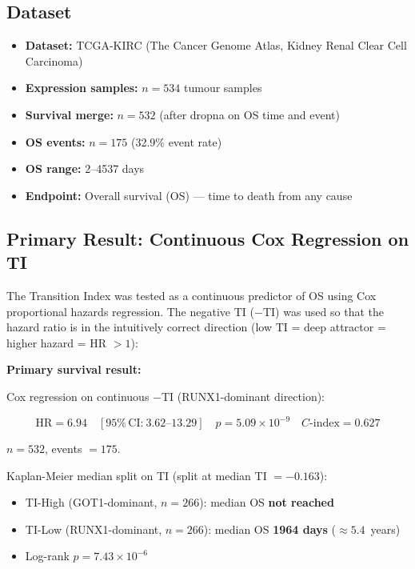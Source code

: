 \documentclass[11pt, a4paper]{article}
\begin{document}
\subsection{Dataset}

\begin{itemize}[noitemsep]
    \item \textbf{Dataset:} TCGA-KIRC
    (The Cancer Genome Atlas, Kidney Renal
    Clear Cell Carcinoma)
    \item \textbf{Expression samples:}
    $n = 534$ tumour samples
    \item \textbf{Survival merge:}
    $n = 532$ (after dropna on OS time
    and event)
    \item \textbf{OS events:} $n = 175$
    (32.9\% event rate)
    \item \textbf{OS range:} 2--4537 days
    \item \textbf{Endpoint:} Overall
    survival (OS) --- time to death from
    any cause
\end{itemize}

\subsection{Primary Result: Continuous Cox
Regression on TI}

The Transition Index was tested as a
continuous predictor of OS using Cox
proportional hazards regression.
The negative TI ($-$TI) was used so that
the hazard ratio is in the intuitively
correct direction (low TI = deep attractor
= higher hazard = HR $> 1$):

\begin{mdframed}[backgroundcolor=statsbox,
                 linecolor=purple!40!black,
                 linewidth=1pt]
\textbf{Primary survival result:}

\medskip
Cox regression on continuous $-$TI
(RUNX1-dominant direction):

\[
\text{HR} = 6.94 \quad
[95\%\,\text{CI:}\ 3.62\text{--}13.29]
\quad p = 5.09 \times 10^{-9}
\quad C\text{-index} = 0.627
\]

$n = 532$, events $= 175$.

\medskip
Kaplan-Meier median split on TI
(split at median TI $= -0.163$):
\begin{itemize}[noitemsep]
    \item TI-High (GOT1-dominant,
    $n = 266$): median OS
    \textbf{not reached}
    \item TI-Low (RUNX1-dominant,
    $n = 266$): median OS
    \textbf{1964 days}
    (${\approx}5.4$~years)
    \item Log-rank $p = 7.43
    \times 10^{-6}$
\end{itemize}
\end{mdframed}
\end{document}
